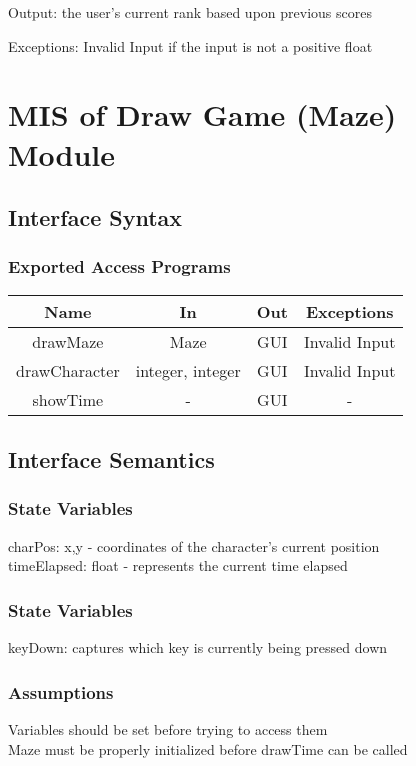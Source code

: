 \documentclass[12pt, titlepage]{article}
\begin{document}
		Output: the user's current rank based upon previous scores
		
		Exceptions: Invalid Input if the input is not a positive float \\

\section{MIS of Draw Game (Maze) Module}
		\subsection{Interface Syntax}
		\subsubsection{Exported Access Programs}
		\begin{tabular}[pos]{|c|c|c|c|}
			\hline
			\textbf{Name}& \textbf{In} & \textbf{Out} & \textbf{Exceptions} \\ \hline
			drawMaze & Maze & GUI & Invalid Input \\ \hline
			drawCharacter & integer, integer & GUI & Invalid Input \\ \hline
			showTime & - & GUI & - \\ \hline
		\end{tabular}
		
		\subsection{Interface Semantics}
		\subsubsection{State Variables}
		charPos: x,y - coordinates of the character's current position\\
		timeElapsed: float - represents the current time elapsed
		\subsubsection{State Variables}
		keyDown: captures which key is currently being pressed down
		\subsubsection{Assumptions}
		Variables should be set before trying to access them \\ 
		Maze must be properly initialized before drawTime can be called \\
		
\end{document}
